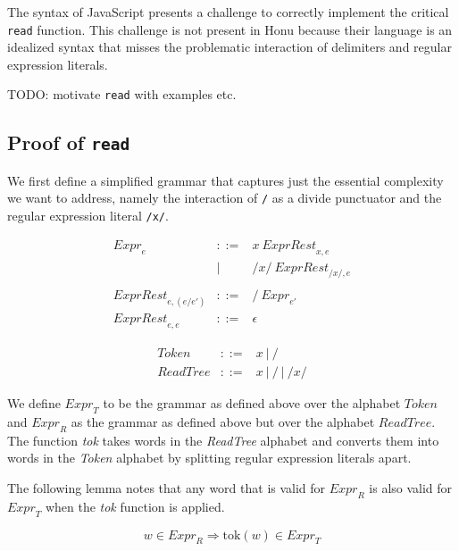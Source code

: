 \documentclass[preprint,10pt]{sigplanconf}
\begin{document}
The syntax of JavaScript presents a challenge to correctly implement
the critical \texttt{read} function. This challenge is not present in Honu
because their language is an idealized syntax that misses the
problematic interaction of delimiters and regular expression literals.

TODO: motivate \texttt{read} with examples etc.

\subsection{Proof of \texttt{read}}
\label{sec-3-1}

We first define a simplified grammar that captures just the essential
complexity we want to address, namely the interaction of \texttt{/} as a
divide punctuator and the regular expression literal \texttt{/x/}.

\[
  \begin{array}{rrl}
    \textit{Expr}_e 
    &::=& x~\textit{ExprRest}_{x, e}
    \\
    &|& /x/~\textit{ExprRest}_{/x/, e}
    \\
    \\
    \textit{ExprRest}_{e, (e / e')}
    &::=&
    /~\textit{Expr}_{e'}
    \\
    \textit{ExprRest}_{e, e}
    &::=&
    \epsilon
  \end{array}
\]


\[
\begin{array}{rcl}
  \textit{Token} &::=& x ~|~ / \\
  \textit{ReadTree} &::=& x ~|~ / ~|~ /x/
\end{array}
\]

We define \( \textit{Expr}_T \) to be the grammar as defined above
over the alphabet \( \textit{Token} \) and \( \textit{Expr}_R \) as
the grammar as defined above but over the alphabet \(
\textit{ReadTree} \). The function \textit{tok} takes words in the
\textit{ReadTree} alphabet and converts them into words in the
\textit{Token} alphabet by splitting regular expression literals
apart.

The following lemma notes that any word that is valid for \(
\textit{Expr}_R \) is also valid for \( \textit{Expr}_T \) when the
\textit{tok} function is applied.

  \begin{lemma}[]\mbox{}
\[
    w \in \textit{Expr}_R
    \Rightarrow
    \textrm{tok}(w) \in \textit{Expr}_T
\]
  \end{lemma}
\end{document}

